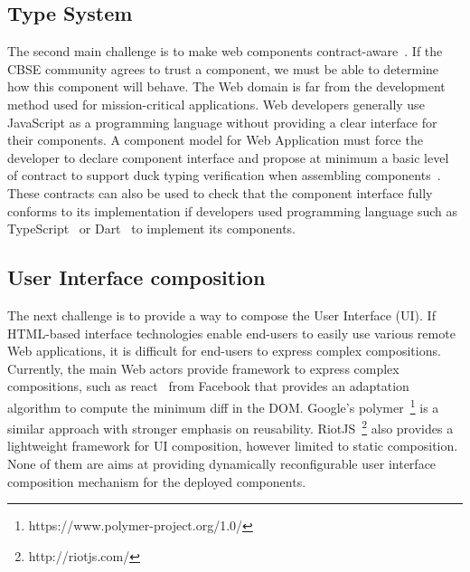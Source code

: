 
\subsection{Type System}
The second main challenge is to make web components contract-aware~\cite{beugnard1999making}. If the CBSE community agrees to trust a component, we must be able to determine how this component will behave. The Web domain is far from the development method used for  mission-critical applications. Web developers generally use JavaScript as a programming language without providing a clear interface for their components. A component model for Web Application must force the developer to declare component interface and propose at minimum a basic level of contract to support duck typing verification when assembling components~\cite{beugnard1999making}. These contracts can also be used to check that the component interface fully conforms to its implementation if developers used  programming language such as TypeScript~\cite{rastogi2015safe} or Dart~\cite{dhiman2012google} to implement its components.

\subsection{User Interface composition}  
The next challenge is to provide a way to compose the User Interface (UI). If HTML-based interface technologies enable end-users to easily use various remote Web applications, it is difficult for end-users to express complex compositions. Currently, the main Web actors provide framework to express complex compositions, such as react~\cite{fedosejev2015react} from Facebook that provides an adaptation algorithm to compute the minimum diff in the DOM. Google's polymer~\footnote{https://www.polymer-project.org/1.0/} is a similar approach with stronger emphasis on reusability. RiotJS~\footnote{http://riotjs.com/} also provides a lightweight framework for UI composition, however limited to static composition. 
None of them are aims at providing dynamically reconfigurable user interface composition mechanism for the deployed components.

